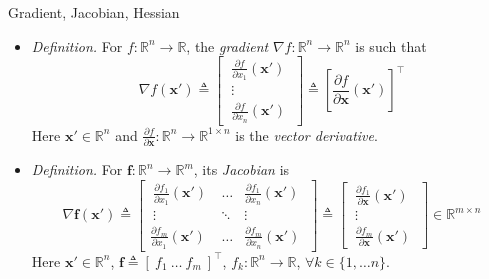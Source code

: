 \documentclass{beamer}
\numberwithin{equation}{section}
\begin{document}
\begin{frame}{Gradient, Jacobian, Hessian}
    \begin{itemize}
        \item
        \textit{Definition.} For $ f : \mathbb{R}^n \rightarrow \mathbb{R} $,
        the \textit{gradient} $ \nabla f : \mathbb{R}^n \rightarrow
        \mathbb{R}^n $ is such that
        \begin{equation*}
            \nabla f(\mathbf{x}') \triangleq \begin{bmatrix}
                \ \frac{\partial f}{\partial x_1}(\mathbf{x}') \ \\
                \ \vdots \ \\
                \ \frac{\partial f}{\partial x_n}(\mathbf{x}') \
            \end{bmatrix} \triangleq \left[
                \frac{\partial f}{\partial \mathbf{x}}(\mathbf{x}')
            \right]^\top
        \end{equation*}
        Here $ \mathbf{x}' \in \mathbb{R}^n $ and
        $ \frac{\partial f}{\partial \mathbf{x}} : \mathbb{R}^n \rightarrow
        \mathbb{R}^{1 \times n} $ is the \textit{vector
        derivative}\footnotemark{}.

        \item
        \textit{Definition.} For $ \mathbf{f} : \mathbb{R}^n \rightarrow
        \mathbb{R}^m $, its \textit{Jacobian} is
        \begin{equation*}
            \nabla\mathbf{f}(\mathbf{x}') \triangleq \begin{bmatrix}
                \ \frac{\partial f_1}{\partial x_1}(\mathbf{x}') \ & \ldots &
                    \frac{\partial f_1}{\partial x_n}(\mathbf{x}') \ \\
                \ \vdots & \ddots & \vdots \ \\
                \frac{\partial f_m}{\partial x_1}(\mathbf{x}') \ & \ldots &
                    \frac{\partial f_m}{\partial x_n}(\mathbf{x}') \
            \end{bmatrix} \triangleq \begin{bmatrix}
                \ \frac{\partial f_1}{\partial\mathbf{x}}(\mathbf{x}') \ \\
                \ \vdots \ \\
                \ \frac{\partial f_m}{\partial\mathbf{x}}(\mathbf{x}') \
            \end{bmatrix} \in \mathbb{R}^{m \times n}
        \end{equation*}
        Here $ \mathbf{x}' \in \mathbb{R}^n $, $ \mathbf{f} \triangleq
        [ \ f_1 \ \ldots \ f_ m \ ]^\top $, $ f_k : \mathbb{R}^n
        \rightarrow \mathbb{R} $, $ \forall k \in \{1, \ldots n\} $.
    \end{itemize}
    
    \medskip
\end{frame}
\end{document}

